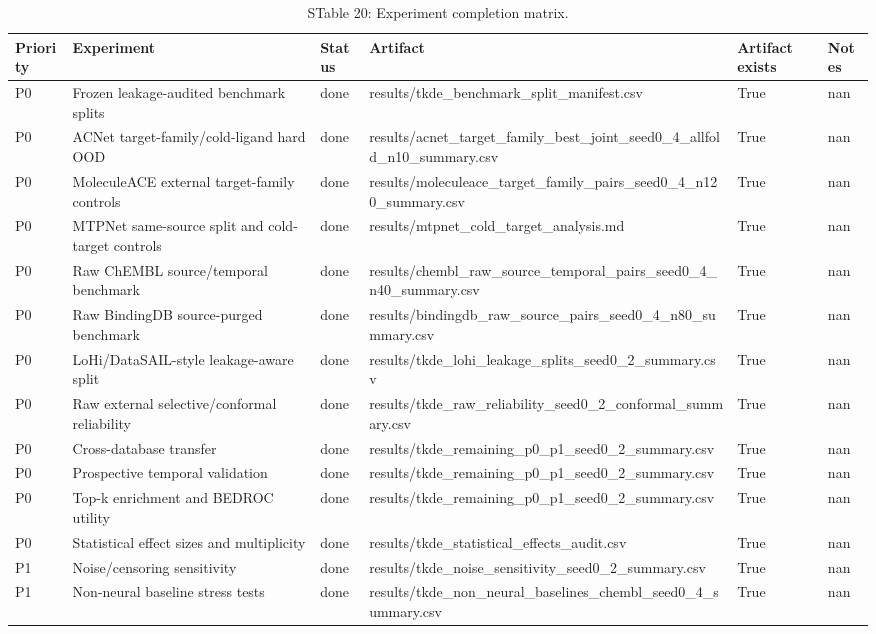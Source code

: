 \begin{table}[!t]
\centering
\scriptsize
\caption{STable 20: Experiment completion matrix.}
\label{tab:supp_completion_matrix}
\begin{tabular}{llllll}
\toprule
Priority & Experiment & Status & Artifact & Artifact exists & Notes \\
\midrule
P0 & Frozen leakage-audited benchmark splits & done & results/tkde\_benchmark\_split\_manifest.csv & True & nan \\
P0 & ACNet target-family/cold-ligand hard OOD & done & results/acnet\_target\_family\_best\_joint\_seed0\_4\_allfold\_n10\_summary.csv & True & nan \\
P0 & MoleculeACE external target-family controls & done & results/moleculeace\_target\_family\_pairs\_seed0\_4\_n120\_summary.csv & True & nan \\
P0 & MTPNet same-source split and cold-target controls & done & results/mtpnet\_cold\_target\_analysis.md & True & nan \\
P0 & Raw ChEMBL source/temporal benchmark & done & results/chembl\_raw\_source\_temporal\_pairs\_seed0\_4\_n40\_summary.csv & True & nan \\
P0 & Raw BindingDB source-purged benchmark & done & results/bindingdb\_raw\_source\_pairs\_seed0\_4\_n80\_summary.csv & True & nan \\
P0 & LoHi/DataSAIL-style leakage-aware split & done & results/tkde\_lohi\_leakage\_splits\_seed0\_2\_summary.csv & True & nan \\
P0 & Raw external selective/conformal reliability & done & results/tkde\_raw\_reliability\_seed0\_2\_conformal\_summary.csv & True & nan \\
P0 & Cross-database transfer & done & results/tkde\_remaining\_p0\_p1\_seed0\_2\_summary.csv & True & nan \\
P0 & Prospective temporal validation & done & results/tkde\_remaining\_p0\_p1\_seed0\_2\_summary.csv & True & nan \\
P0 & Top-k enrichment and BEDROC utility & done & results/tkde\_remaining\_p0\_p1\_seed0\_2\_summary.csv & True & nan \\
P0 & Statistical effect sizes and multiplicity & done & results/tkde\_statistical\_effects\_audit.csv & True & nan \\
P1 & Noise/censoring sensitivity & done & results/tkde\_noise\_sensitivity\_seed0\_2\_summary.csv & True & nan \\
P1 & Non-neural baseline stress tests & done & results/tkde\_non\_neural\_baselines\_chembl\_seed0\_4\_summary.csv & True & nan \\

\end{tabular}
\end{table}
